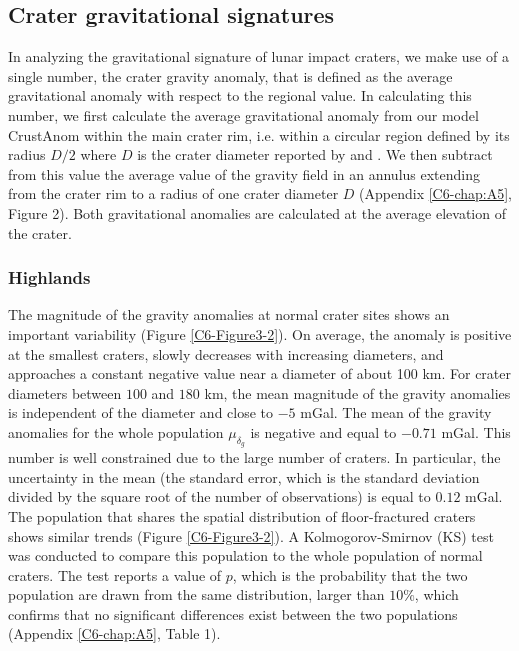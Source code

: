 \subsection{Crater gravitational signatures}
\label{C6-sec:crat-grav-sign}
  
In analyzing the  gravitational signature of lunar  impact craters, we
make  use of  a single  number, the  crater gravity  anomaly, that  is
defined  as the  average  gravitational anomaly  with  respect to  the
regional value.   In calculating this  number, we first  calculate the
average gravitational anomaly from our model CrustAnom within the main
crater rim, i.e.  within a circular region defined by its radius $D/2$
where $D$ is  the crater diameter reported  by \citet{Head:2010fy} and
\citet{Jozwiak:2012dq}.  We then subtract  from this value the average
value of the gravity field in an annulus extending from the crater rim
to a radius of one crater diameter $D$ (Appendix \ref{C6-chap:A5}, Figure
2).   Both  gravitational  anomalies  are calculated  at  the  average
elevation of the crater.

\subsubsection{Highlands}
\label{C6-sec:highlands-1}
  
The magnitude of the gravity anomalies at normal crater sites shows an
important  variability  (Figure  \ref{C6-Figure3-2}).   On  average,  the
anomaly is  positive at  the smallest  craters, slowly  decreases with
increasing diameters, and approaches a  constant negative value near a
diameter  of about  100 km.   For crater  diameters between  $100$ and
$180$ km, the  mean magnitude of the gravity  anomalies is independent
of  the diameter  and close  to $-5$  mGal.  The  mean of  the gravity
anomalies for  the whole  population $\mu_{\delta_g}$ is  negative and
equal to  $-0.71$ mGal.  This  number is  well constrained due  to the
large number of  craters.  In particular, the uncertainty  in the mean
(the standard  error, which is  the standard deviation divided  by the
square root of  the number of observations) is equal  to $ 0.12$ mGal.
The population that shares the spatial distribution of floor-fractured
craters   shows   similar    trends   (Figure   \ref{C6-Figure3-2}).    A
Kolmogorov-Smirnov (KS) test was  conducted to compare this population
to the whole  population of normal craters.  The test  reports a value
of $p$,  which is the  probability that  the two population  are drawn
from the same distribution, larger than $10\%$, which confirms that no
significant differences  exist between  the two  populations (Appendix
\ref{C6-chap:A5}, Table 1).
  
